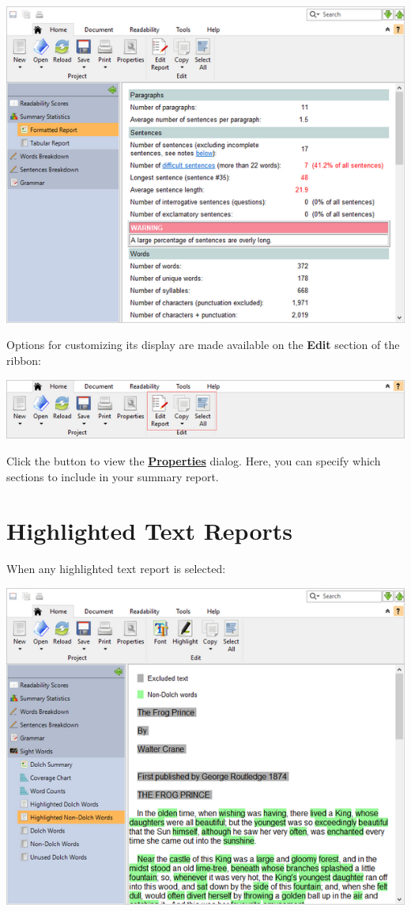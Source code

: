 \documentclass[
]{book}
\theoremstyle{definition}
\theoremstyle{definition}
\theoremstyle{definition}
\theoremstyle{definition}
\theoremstyle{remark}
\begin{document}
\includegraphics{Images/featuresstats.png}

Options for customizing its display are made available on the \textbf{Edit} section of the ribbon:

\includegraphics{Images/RibbonEditStats.png}

Click the  button to view the \protect\hyperlink{options-statistics}{\textbf{Properties}} dialog. Here, you can specify which sections to include in your summary report.

\hypertarget{highlighted-text-reports}{%
\section{Highlighted Text Reports}\label{highlighted-text-reports}}

When any highlighted text report is selected:

\includegraphics{Images/dolchhighlightednonwords.png}
\end{document}
